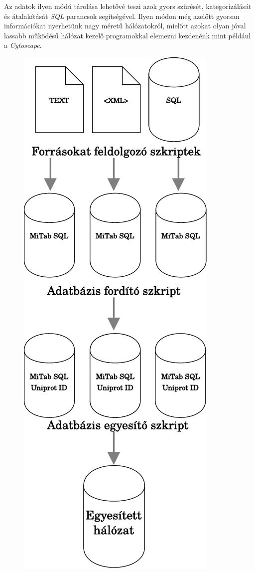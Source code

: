 \documentclass[a4paper,12pt]{article}
\begin{document}
			Az adatok ilyen módú tárolása lehetővé teszi azok gyors szűrését, kategorizálását és átalakítását \textit{SQL} parancsok segítségével. Ilyen módon még azelőtt gyorsan információkat nyerhetünk nagy méretű hálózatokról, mielőtt azokat olyan jóval lassabb működésű hálózat kezelő programokkal elemezni kezdenénk mint például a \textit{Cytoscape}.

			 	 \begin{figure}[H]
			 		 \includegraphics[scale=0.7]{img/Signalink_Layer0.pdf}
			 		 \centering


\end{figure}
\end{document}
